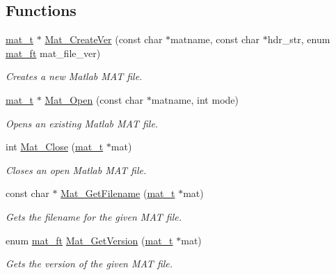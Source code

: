 \subsection*{Functions}
\begin{DoxyCompactItemize}
\item 
\hyperlink{group___m_a_t_gab0fc888f5a5d79943b16284b1f91c2e8}{mat\+\_\+t} $\ast$ \hyperlink{group___m_a_t_ga22d404f203af7869c841400e7ad247cf}{Mat\+\_\+\+Create\+Ver} (const char $\ast$matname, const char $\ast$hdr\+\_\+str, enum \hyperlink{group___m_a_t_gad03442b8378999189d510e3745c702b7}{mat\+\_\+ft} mat\+\_\+file\+\_\+ver)
\begin{DoxyCompactList}\small\item\em Creates a new Matlab M\+AT file. \end{DoxyCompactList}\item 
\hyperlink{group___m_a_t_gab0fc888f5a5d79943b16284b1f91c2e8}{mat\+\_\+t} $\ast$ \hyperlink{group___m_a_t_gafbfedb5636a99f0ef867520c47f77d18}{Mat\+\_\+\+Open} (const char $\ast$matname, int mode)
\begin{DoxyCompactList}\small\item\em Opens an existing Matlab M\+AT file. \end{DoxyCompactList}\item 
int \hyperlink{group___m_a_t_ga101c92ff7bde4a2d4615661beba09262}{Mat\+\_\+\+Close} (\hyperlink{group___m_a_t_gab0fc888f5a5d79943b16284b1f91c2e8}{mat\+\_\+t} $\ast$mat)
\begin{DoxyCompactList}\small\item\em Closes an open Matlab M\+AT file. \end{DoxyCompactList}\item 
const char $\ast$ \hyperlink{group___m_a_t_ga671ff3c0247037c343b5df121ac0b824}{Mat\+\_\+\+Get\+Filename} (\hyperlink{group___m_a_t_gab0fc888f5a5d79943b16284b1f91c2e8}{mat\+\_\+t} $\ast$mat)
\begin{DoxyCompactList}\small\item\em Gets the filename for the given M\+AT file. \end{DoxyCompactList}\item 
enum \hyperlink{group___m_a_t_gad03442b8378999189d510e3745c702b7}{mat\+\_\+ft} \hyperlink{group___m_a_t_gabef04e2a55e78b0f7d9b2ddc5f42d03c}{Mat\+\_\+\+Get\+Version} (\hyperlink{group___m_a_t_gab0fc888f5a5d79943b16284b1f91c2e8}{mat\+\_\+t} $\ast$mat)
\begin{DoxyCompactList}\small\item\em Gets the version of the given M\+AT file. \end{DoxyCompactList}\item 

\end{DoxyCompactItemize}
